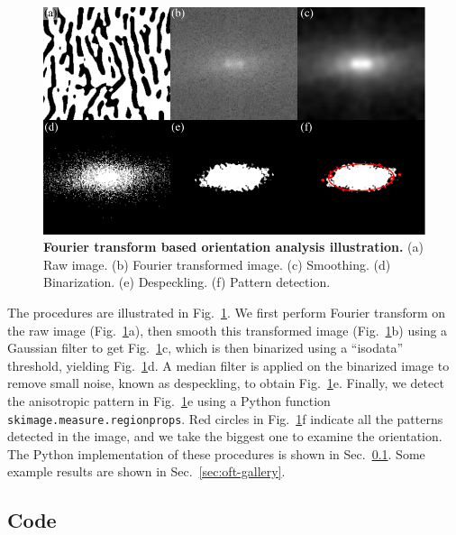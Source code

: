 \begin{figure}[h]
	\begin{center}
	\includegraphics[width=5.5in]{Figs/A-2/orientationFT.pdf}
	\end{center}
	\caption[Fourier transform based orientation analysis illustration]
	{
	\textbf{Fourier transform based orientation analysis illustration.}
  (a) Raw image.
  (b) Fourier transformed image.
  (c) Smoothing.
  (d) Binarization.
  (e) Despeckling.
  (f) Pattern detection.
	}
	\label{fig:oft-illustration}
\end{figure}

The procedures are illustrated in Fig.~\ref{fig:oft-illustration}. We first perform Fourier transform on the raw image (Fig.~\ref{fig:oft-illustration}a), then smooth this transformed image (Fig.~\ref{fig:oft-illustration}b) using a Gaussian filter to get Fig.~\ref{fig:oft-illustration}c, which is then binarized using a ``isodata'' threshold, yielding Fig.~\ref{fig:oft-illustration}d. A median filter is applied on the binarized image to remove small noise, known as despeckling, to obtain Fig.~\ref{fig:oft-illustration}e. Finally, we detect the anisotropic pattern in Fig.~\ref{fig:oft-illustration}e using a Python function \texttt{skimage.measure.regionprops}. Red circles in Fig.~\ref{fig:oft-illustration}f indicate all the patterns detected in the image, and we take the biggest one to examine the orientation. The Python implementation of these procedures is shown in Sec.~\ref{sec:oft-code}. Some example results are shown in Sec.~\ref{sec:oft-gallery}.

\subsection{Code}
\label{sec:oft-code}

